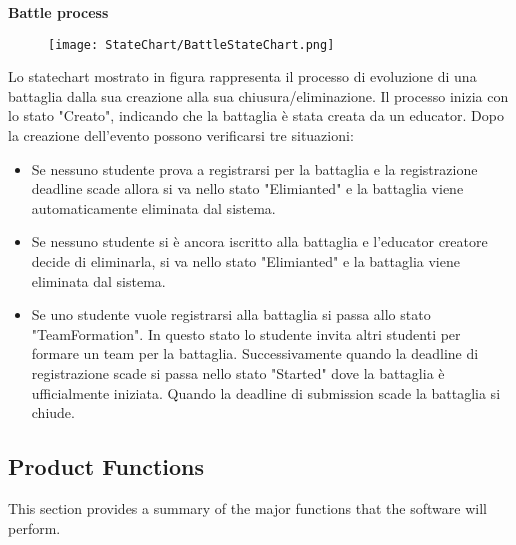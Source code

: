 \noindent\textbf{Battle process}
    \begin{figure}[H]
  \texttt{[image: StateChart/BattleStateChart.png]} 
  \label{fig:immagine}
\end{figure}
\noindent Lo statechart mostrato in figura rappresenta il processo di evoluzione di una battaglia dalla sua creazione alla sua chiusura/eliminazione. Il processo inizia con lo stato "Creato", indicando che la battaglia è stata creata da un educator. Dopo la creazione dell'evento possono verificarsi tre situazioni:
 \begin{itemize}
     \item  Se nessuno studente prova a registrarsi per la battaglia e la registrazione deadline scade allora si va nello stato "Elimianted" e la battaglia viene automaticamente eliminata dal sistema.
     \item  Se nessuno studente si è ancora iscritto alla battaglia e l'educator creatore decide di eliminarla, si va nello stato "Elimianted" e la battaglia viene  eliminata dal sistema.
     \item  Se uno studente vuole registrarsi alla battaglia si passa allo stato "TeamFormation". In questo stato lo studente invita altri studenti per formare un team per la battaglia. Successivamente quando la deadline di registrazione scade si passa nello stato "Started" dove la battaglia è ufficialmente iniziata. Quando la deadline di submission scade la battaglia si chiude.

 \end{itemize}

\subsection{Product Functions}
This section provides  a summary of the major functions that the software will perform.\\

